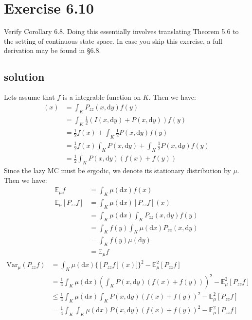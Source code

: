 \documentclass{article}
\begin{document}
\iffalse
\section{Exercise 6.10}
Verify Corollary 6.8. Doing this essentially involves translating Theorem 5.6 to the setting of continuous state space. In case you skip this exercise, a full derivation may be found in §6.8.
\subsection{solution}
Lets assume that $f$ is a integrable function on $K$. Then we have:
\begin{align*}
  [P_{zz}f] (x) &= \int_K P_{zz}(x,\mathrm{d}y) f(y) \\
  &= \int_K \frac{1}{2}(I(x,\mathrm{d}y) + P(x,\mathrm{d}y)) f(y) \\
  &= \frac{1}{2}f(x) + \int_K \frac{1}{2} P(x,\mathrm{d}y) f(y) \\
  &= \frac{1}{2}f(x)\int_K P(x,\mathrm{d}y) + \int_K \frac{1}{2} P(x,\mathrm{d}y) f(y) \\
  &= \frac{1}{2} \int_K P(x,\mathrm{d}y) (f(x) + f(y))
\end{align*}
Since the lazy MC must be ergodic, we denote its stationary distribution by $\mu$. Then we have:
\begin{align*}
  \mathbb{E}_\mu f &= \int_K \mu(\mathrm{d}x)f(x) \\
  \mathbb{E}_\mu [P_{zz}f] &= \int_K \mu(\mathrm{d}x) [P_{zz}f](x) \\
   &= \int_K \mu(\mathrm{d}x) \int_K P_{zz}(x,\mathrm{d}y)f(y) \\
   &= \int_K f(y) \int_K \mu(\mathrm{d}x)P_{zz}(x,\mathrm{d}y) \\
   &= \int_K f(y) \mu(\mathrm{d}y) \\
   &= \mathbb{E}_\mu f
\end{align*}
\begin{align*}
  \mathrm{Var}_\mu (P_{zz}f) &= \int_K \mu(\mathrm{d}x) \{[P_{zz}f](x)]\}^2 - \mathbb{E}_\mu^2[P_{zz}f] \\
  &= \frac{1}{4}\int_K \mu(\mathrm{d}x) (\int_K P(x,\mathrm{d}y)(f(x) + f(y)))^2 - \mathbb{E}_\mu^2[P_{zz}f] \\
  &\leq \frac{1}{4}\int_K\mu(\mathrm{d}x) \int_K P(x,\mathrm{d}y) (f(x)+f(y))^2 - \mathbb{E}_\mu^2[P_{zz}f] \\
  &= \frac{1}{4}\int_K\int_K\mu(\mathrm{d}x) P(x,\mathrm{d}y) (f(x)+f(y))^2 - \mathbb{E}_\mu^2[P_{zz}f]
\end{align*}
\end{document}
